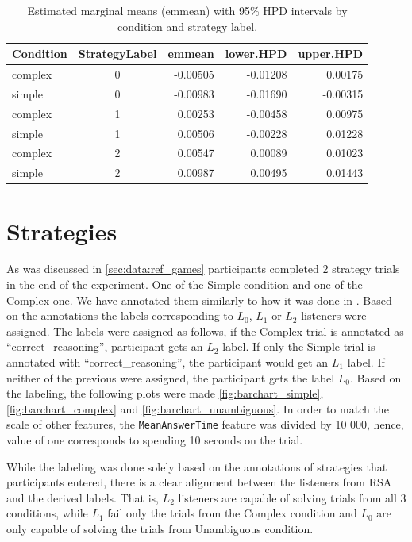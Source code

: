 \begin{table}[ht]
\centering
\begin{tabular}{l c r r r}
\hline
Condition & StrategyLabel & emmean & lower.HPD & upper.HPD \\
\hline
complex & 0 & -0.00505 & -0.01208 &  0.00175 \\
simple  & 0 & -0.00983 & -0.01690 & -0.00315 \\
complex & 1 &  0.00253 & -0.00458 &  0.00975 \\
simple  & 1 &  0.00506 & -0.00228 &  0.01228 \\
complex & 2 &  0.00547 &  0.00089 &  0.01023 \\
simple  & 2 &  0.00987 &  0.00495 &  0.01443 \\
\hline
\end{tabular}
\caption{Estimated marginal means (emmean) with 95\% HPD intervals by condition and strategy label.}
\label{tab:rate_toggling_emmeans}
\end{table}




\section{Strategies}

As was discussed in \autoref{sec:data:ref_games} participants completed 2 strategy trials in the end of the experiment. One of the Simple condition and one of the Complex one. We have annotated them similarly to how it was done in \cite{Mayn_2023}. Based on the annotations the labels corresponding to $L_0$, $L_1$ or $L_2$ listeners were assigned. The labels were assigned as follows, if the Complex trial is annotated as ``correct\_reasoning'', participant gets an $L_2$ label. If only the Simple trial is annotated with ``correct\_reasoning'', the participant would get an $L_1$ label. If neither of the previous were assigned, the participant gets the label $L_0$. Based on the labeling, the following plots were made \autoref{fig:barchart_simple}, \autoref{fig:barchart_complex} and \autoref{fig:barchart_unambiguous}. In order to match the scale of other features, the \texttt{MeanAnswerTime} feature was divided by 10 000, hence, value of one corresponds to spending 10 seconds on the trial.

While the labeling was done solely based on the annotations of strategies that participants entered, there is a clear alignment between the listeners from RSA and the derived labels. That is, $L_2$ listeners are capable of solving trials from all 3 conditions, while $L_1$ fail only the trials from the Complex condition and $L_0$ are only capable of solving the trials from Unambiguous condition. 

